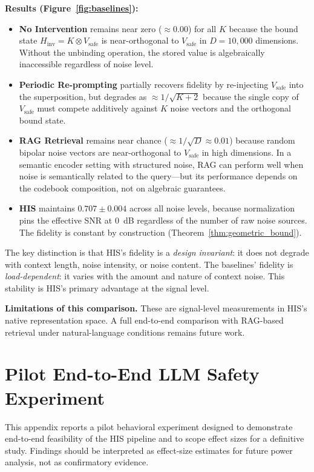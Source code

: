 \documentclass[a4paper,11pt]{article}
\begin{document}
\textbf{Results (Figure~\ref{fig:baselines}):}
\begin{itemize}
    \item \textbf{No Intervention} remains near zero ($\approx 0.00$) for all $K$ because the bound state $H_{\text{inv}} = K \otimes V_{\text{safe}}$ is near-orthogonal to $V_{\text{safe}}$ in $D = 10{,}000$ dimensions. Without the unbinding operation, the stored value is algebraically inaccessible regardless of noise level.
    \item \textbf{Periodic Re-prompting} partially recovers fidelity by re-injecting $V_{\text{safe}}$ into the superposition, but degrades as $\approx 1/\sqrt{K+2}$ because the single copy of $V_{\text{safe}}$ must compete additively against $K$ noise vectors and the orthogonal bound state.
    \item \textbf{RAG Retrieval} remains near chance ($\approx 1/\sqrt{D} \approx 0.01$) because random bipolar noise vectors are near-orthogonal to $V_{\text{safe}}$ in high dimensions. In a semantic encoder setting with structured noise, RAG can perform well when noise is semantically related to the query---but its performance depends on the codebook composition, not on algebraic guarantees.
    \item \textbf{HIS} maintains $0.707 \pm 0.004$ across all noise levels, because normalization pins the effective SNR at 0~dB regardless of the number of raw noise sources. The fidelity is constant by construction (Theorem~\ref{thm:geometric_bound}).
\end{itemize}

The key distinction is that HIS's fidelity is a \textit{design invariant}: it does not degrade with context length, noise intensity, or noise content. The baselines' fidelity is \textit{load-dependent}: it varies with the amount and nature of context noise. This stability is HIS's primary advantage at the signal level.

\textbf{Limitations of this comparison.} These are signal-level measurements in HIS's native representation space. A full end-to-end comparison with RAG-based retrieval under natural-language conditions remains future work.

\section{Pilot End-to-End LLM Safety Experiment}
\label{sec:llm_experiment}

This appendix reports a pilot behavioral experiment designed to demonstrate end-to-end feasibility of the HIS pipeline and to scope effect sizes for a definitive study. Findings should be interpreted as effect-size estimates for future power analysis, not as confirmatory evidence.
\end{document}
